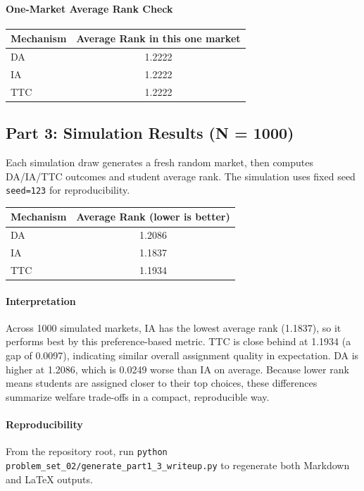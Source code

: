 \paragraph{One-Market Average Rank Check}
\begin{center}
\begin{tabular}{lc}
\hline
Mechanism & Average Rank in this one market \\
\hline
DA & 1.2222 \\
IA & 1.2222 \\
TTC & 1.2222 \\
\hline
\end{tabular}
\end{center}

\subsection*{Part 3: Simulation Results (N = 1000)}
Each simulation draw generates a fresh random market, then computes DA/IA/TTC outcomes and student average rank. The simulation uses fixed seed \texttt{seed=123} for reproducibility.

\begin{center}
\begin{tabular}{lc}
\hline
Mechanism & Average Rank (lower is better) \\
\hline
DA & 1.2086 \\
IA & 1.1837 \\
TTC & 1.1934 \\
\hline
\end{tabular}
\end{center}

\paragraph{Interpretation}
Across 1000 simulated markets, IA has the lowest average rank (1.1837), so it performs best by this preference-based metric. TTC is close behind at 1.1934 (a gap of 0.0097), indicating similar overall assignment quality in expectation. DA is higher at 1.2086, which is 0.0249 worse than IA on average. Because lower rank means students are assigned closer to their top choices, these differences summarize welfare trade-offs in a compact, reproducible way.

\paragraph{Reproducibility}
From the repository root, run \texttt{python problem\_set\_02/generate\_part1\_3\_writeup.py} to regenerate both Markdown and LaTeX outputs.
